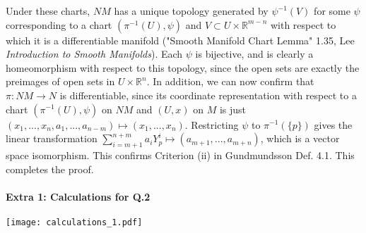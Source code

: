 \documentclass[10pt,letter]{article}
\begin{document}
Under these charts, $NM$ has a unique topology generated by $\psi^{-1}(V)$ for some $\psi$ corresponding to a chart $(\pi^{-1}(U),\psi)$ and $V \subset U \times \mathbb{R}^{m-n}$ with respect to which it is a differentiable manifold ("Smooth Manifold Chart Lemma" 1.35, Lee \textit{Introduction to Smooth Manifolds}).   Each $\psi$ is bijective, and is clearly a homeomorphism with respect to this topology, since the open sets are exactly the preimages of open sets in $U \times \mathbb{R}^n$. In addition, we can now confirm that $\pi: NM \rightarrow N$ is differentiable, since its coordinate representation with respect to a chart $(\pi^{-1}(U),\psi)$ on $NM$ and $(U,x)$ on $M$ is just $(x_1,...,x_n,a_1,...,a_{n-m}) \mapsto (x_1,...,x_n)$. Restricting $\psi$ to $\pi^{-1}(\lbrace p \rbrace)$ gives the linear transformation $\sum_{i=m+1}^{n+m} a_i Y^i_p \mapsto (a_{m+1},...,a_{m+n})$, which is a vector space isomorphism. This confirms Criterion (ii) in Gundmundsson Def. 4.1. This completes the proof. 

\newpage
\paragraph*{Extra 1: Calculations for Q.2}
\texttt{[image: calculations\_1.pdf]}
\end{document}

